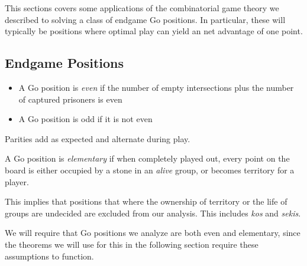 \documentclass[../math194_paper.tex]{subfiles}
\begin{document}
This sections covers some applications of the combinatorial game theory we 
described to solving a class of endgame Go positions. In particular, these
will typically be positions where optimal play can yield an net advantage 
of one point.

\subsection{Endgame Positions}

\begin{definition} \label{parity} \:
    \begin{itemize}
        \item A Go position is \textit{even} if the number of empty intersections plus the number of 
        captured prisoners is even
        \item A Go position is odd if it is not even
    \end{itemize}
\end{definition}
Parities add as expected and alternate during play.

\begin{definition}
    \label{elementary}
    A Go position is \textit{elementary} if when completely played out, every point on the board 
    is either occupied by a stone in an \textit{alive} group, or becomes territory for a player.
\end{definition}
This implies that positions that where the ownership of territory or the life of groups are undecided
are excluded from our analysis. This includes \textit{kos} and \textit{sekis}.

We will require that Go positions we analyze are both even and elementary,
since the theorems we will use for this in the following section require these assumptions to function.
\end{document}

